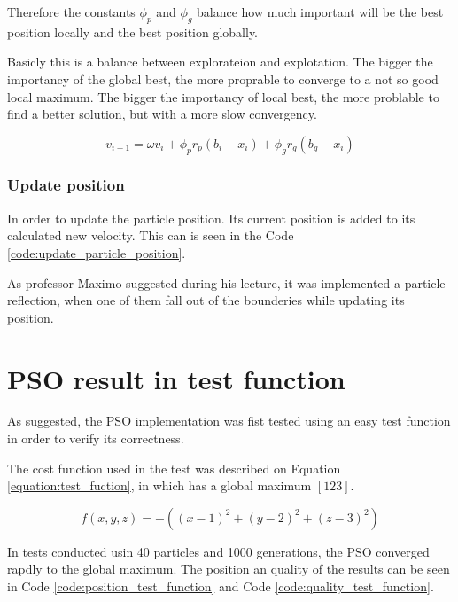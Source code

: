Therefore the constants $\phi_p$ and $\phi_g$ balance how much important will be the best position locally and the best position globally.

Basicly this is a balance between explorateion and explotation. The bigger the importancy of the global best, the more proprable to converge to a not so good local maximum. The bigger the importancy of local best, the more problable to find a better solution, but with a more slow convergency.

\begin{equation}
    \label{equation:update_velocity}
    v_{i+1} = \omega v_i + \phi_p r_p (b_i - x_i) + \phi_g r_g (b_g - x_i)
\end{equation}

\subsubsection {Update position}

In order to update the particle position. Its current position is added to its calculated new velocity. This can is seen in the Code \ref{code:update_particle_position}.

As professor Maximo suggested during his lecture, it was implemented a particle reflection, when one of them fall out of the bounderies while updating its position.

\section{PSO result in test function}

As suggested, the PSO implementation was fist tested using an easy test function in order to verify its correctness.

The cost function used in the test was described on Equation \ref{equation:test_fuction}, in which has a global maximum $[1 2 3]$.

\begin{equation}
    \label{equation:test_fuction}
    f(x, y, z) = -((x - 1)^2 + (y-2)^2 + (z-3)^2)
\end{equation}

In tests conducted usin 40 particles and 1000 generations, the PSO converged rapdly to the global maximum. The position an quality of the results can be seen in Code \ref{code:position_test_function} and Code \ref{code:quality_test_function}.



